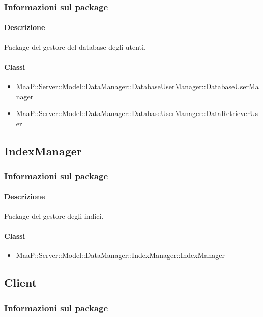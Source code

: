 \subsubsection{Informazioni sul package}
\paragraph{Descrizione}
Package del gestore del database degli utenti.

\paragraph{Classi}
\begin{itemize}
\item MaaP::Server::Model::DataManager::DatabaseUserManager::DatabaseUserManager
\item MaaP::Server::Model::DataManager::DatabaseUserManager::DataRetrieverUser
\end{itemize}

\subsection{IndexManager}
\subsubsection{Informazioni sul package}
\paragraph{Descrizione}
Package del gestore degli indici.

\paragraph{Classi}
\begin{itemize}
\item MaaP::Server::Model::DataManager::IndexManager::IndexManager
\end{itemize}

\subsection{Client}
\subsubsection{Informazioni sul package}
